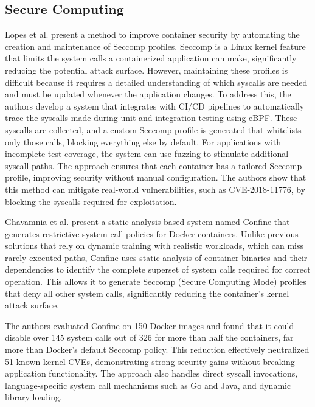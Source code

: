 \documentclass[12pt]{report}
\begin{document}
\begin{doublespace}
\section{Secure Computing}

Lopes et al. \cite{lopes2020container} present a method to improve container security by automating the creation and maintenance of Seccomp profiles. Seccomp is a Linux kernel feature that limits the system calls a containerized application can make, significantly reducing the potential attack surface. However, maintaining these profiles is difficult because it requires a detailed understanding of which syscalls are needed and must be updated whenever the application changes. To address this, the authors develop a system that integrates with CI/CD pipelines to automatically trace the syscalls made during unit and integration testing using eBPF. These syscalls are collected, and a custom Seccomp profile is generated that whitelists only those calls, blocking everything else by default. For applications with incomplete test coverage, the system can use fuzzing to stimulate additional syscall paths. The approach ensures that each container has a tailored Seccomp profile, improving security without manual configuration. The authors show that this method can mitigate real-world vulnerabilities, such as CVE-2018-11776, by blocking the syscalls required for exploitation.

Ghavamnia et al. \cite{ghavamnia2020confine} present a static analysis-based system named Confine that generates restrictive system call policies for Docker containers. Unlike previous solutions that rely on dynamic training with realistic workloads, which can miss rarely executed paths, Confine uses static analysis of container binaries and their dependencies to identify the complete superset of system calls required for correct operation. This allows it to generate Seccomp (Secure Computing Mode) profiles that deny all other system calls, significantly reducing the container’s kernel attack surface.

The authors evaluated Confine on 150 Docker images and found that it could disable over 145 system calls out of 326 for more than half the containers, far more than Docker’s default Seccomp policy. This reduction effectively neutralized 51 known kernel CVEs, demonstrating strong security gains without breaking application functionality. The approach also handles direct syscall invocations, language-specific system call mechanisms such as Go and Java, and dynamic library loading.


\end{doublespace}
\end{document}
